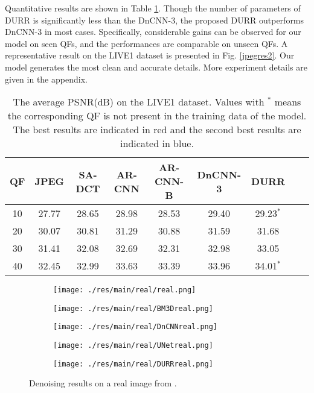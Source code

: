 \documentclass{article} %
\begin{document}
Quantitative results are shown in Table \ref{jpegtab}.
Though the number of parameters of DURR is significantly less than
the DnCNN-3, the proposed DURR outperforms DnCNN-3 in most cases.
Specifically, considerable gains can be observed for our model on seen QFs, and
the performances are comparable on unseen QFs. A representative
result on the LIVE1 dataset is presented in Fig. \ref{jpegres2}.
Our model generates the most clean and accurate details.
More experiment details are given in the appendix.

\begin{table}[htp!]
	\caption{The average PSNR(dB) on the LIVE1 dataset. Values with $^*$ means
		the corresponding QF is not present in the training data of the model.
		The best results are indicated in red and the second best results are indicated in blue.}
	\label{jpegtab}
	\centering
	\begin{tabular}{c|cccccccc}
		\toprule
		QF
		&JPEG
		&SA-DCT
		&AR-CNN
		&AR-CNN-B
		&DnCNN-3
		&DURR\\
		\midrule\midrule
		10   &27.77 &28.65 &28.98 &28.53 &{\color{red}29.40} &{\color{blue}29.23$^*$} \\
		20   &30.07 &30.81 &31.29 &30.88 &{\color{blue}31.59} &{\color{red} 31.68}     \\
		30   &31.41 &32.08 &32.69 &32.31 &{\color{blue}32.98} &{\color{red}33.05}     \\
		40   &32.45 &32.99 &33.63 &33.39 &{\color{blue}33.96} &{\color{red}34.01$^*$} \\
		\bottomrule
	\end{tabular}
	
\end{table}

\begin{figure}[htp!]
	\centering
	\begin{subfigure}[t]{0.19\textwidth}
		\centering
		\texttt{[image: ./res/main/real/real.png]}
	\end{subfigure}
	\begin{subfigure}[t]{0.19\textwidth}
		\centering
		\texttt{[image: ./res/main/real/BM3Dreal.png]}
	\end{subfigure}
	\begin{subfigure}[t]{0.19\textwidth}
		\centering
		\texttt{[image: ./res/main/real/DnCNNreal.png]}
	\end{subfigure}
	\begin{subfigure}[t]{0.19\textwidth}
		\centering
		\texttt{[image: ./res/main/real/UNetreal.png]}
	\end{subfigure}
	\begin{subfigure}[t]{0.19\textwidth}
		\centering
		\texttt{[image: ./res/main/real/DURRreal.png]}
	\end{subfigure}
	\caption{Denoising results on a real image from \cite{lebrun2015noise}.}
	\label{real}
\end{figure}
\end{document}
